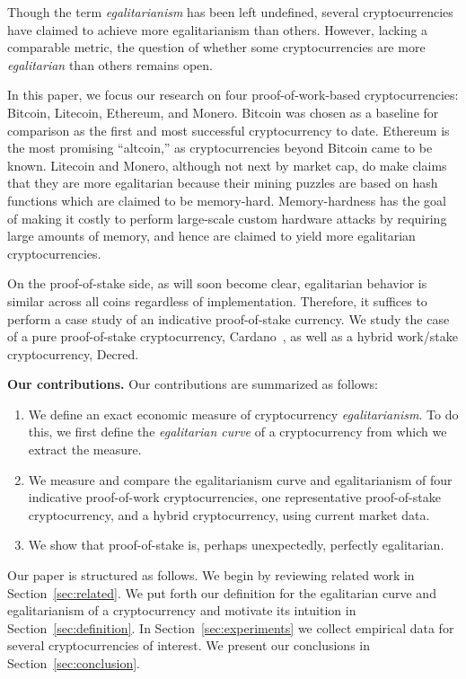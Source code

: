 
Though the term \emph{egalitarianism} has been left undefined, several
cryptocurrencies have claimed to achieve more egalitarianism than others.
However, lacking a comparable metric, the question of whether some
cryptocurrencies are more \emph{egalitarian} than others remains open.

In this paper, we focus our research on four proof-of-work-based
cryptocurrencies: Bitcoin, Litecoin, Ethereum, and Monero. Bitcoin was chosen as
a baseline for comparison as the first and most successful cryptocurrency to
date. Ethereum is the most promising ``altcoin,'' as cryptocurrencies beyond
Bitcoin came to be known. Litecoin and Monero, although not next by market cap,
do make claims that they are more egalitarian because their mining puzzles are
based on hash functions which are claimed to be memory-hard. Memory-hardness
has the goal of making it costly to perform large-scale custom hardware attacks
by requiring large amounts of memory, and hence are claimed to yield more
egalitarian cryptocurrencies.

On the proof-of-stake side, as will soon become clear, egalitarian behavior is
similar across all coins regardless of implementation. Therefore, it suffices to
perform a case study of an indicative proof-of-stake currency. We study the case of a
pure proof-of-stake cryptocurrency, Cardano~\cite{C:KRDO17}, as well as a hybrid
work/stake cryptocurrency, Decred.

\noindent
\textbf{Our contributions.}
Our contributions are summarized as follows:

\begin{enumerate}
  \item We define an exact economic measure of cryptocurrency
        \emph{egalitarianism}.
        To do this, we first define the \emph{egalitarian curve} of a
        cryptocurrency from which we extract the measure.
  \item We measure and compare the egalitarianism curve and egalitarianism of
        four indicative proof-of-work cryptocurrencies, one representative
        proof-of-stake cryptocurrency, and a hybrid cryptocurrency, using
        current market data.
  \item We show that proof-of-stake is, perhaps unexpectedly, perfectly
        egalitarian.
\end{enumerate}

Our paper is structured as follows. We begin by reviewing related work in
Section~\ref{sec:related}. We put forth our definition for the egalitarian curve
and egalitarianism of a cryptocurrency and motivate its intuition in
Section~\ref{sec:definition}. In Section~\ref{sec:experiments} we collect
empirical data for several cryptocurrencies of interest. We present our
conclusions in Section~\ref{sec:conclusion}.

